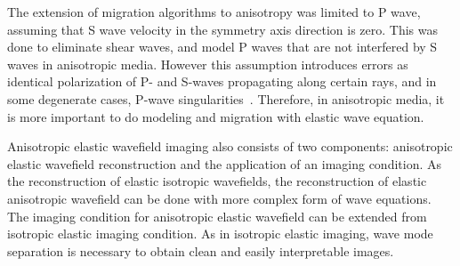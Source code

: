  
The extension of migration algorithms to anisotropy was limited to P wave, assuming that S wave velocity in the symmetry axis direction is zero. This was done to eliminate shear waves, and model P waves that are not interfered by S waves in anisotropic media. However this assumption introduces errors as identical polarization of P- and S-waves propagating along certain rays, and in some degenerate cases, P-wave singularities~\cite[]{alkhalifah:623,grechka:576}. Therefore, in anisotropic media, it is more important to do modeling and migration with elastic wave equation.


Anisotropic elastic wavefield imaging also consists of two components: anisotropic elastic wavefield reconstruction and the application of an imaging condition. As the reconstruction of elastic isotropic wavefields, the reconstruction of elastic anisotropic wavefield can be done with more complex form of wave equations. The imaging condition for anisotropic elastic wavefield can be extended from isotropic elastic imaging condition. As in isotropic elastic imaging, wave mode separation is necessary to obtain clean and easily interpretable images.

